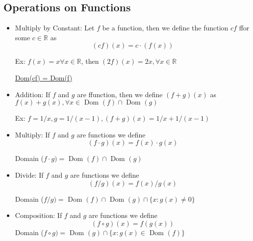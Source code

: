 \documentclass{report}
\begin{document}
    \subsection{Operations on Functions}%
    \begin{itemize}
      \item Multiply by Constant:  Let $f$ be a function, then we define
        the function $cf$ ffor some $ c\in \mathbb{R}$ as
        \[ (cf)(x) = c \cdot(f(x)) \]

        Ex: $f(x) = x \forall x \in \mathbb{R}$, then
        $(2f)(x) = 2x, \forall x \in \mathbb{R}$

        \underline{Dom(cf) = Dom(f)}
      \item Addition: If $f$ and $g$ are ffunction, then we define
        $(f + g)(x)$ as $f(x) + g(x), \forall x \in \text{ Dom }(f)
        \cap \text{ Dom }(g)$

        Ex: $f = 1/x, g = 1/(x-1), (f+g)(x) = 1/x + 1/(x-1)$

      \item Multiply: If $f$ and $g$ are functions we define
          \[ (f \cdot g)(x) = f(x) \cdot g(x) \]

          Domain ($f \cdot g) = \text{ Dom }(f) \cap \text{ Dom }(g)$

      \item Divide: If $f$ and $g$ are functions we define
          \[ (f / g)(x) = f(x) / g(x) \]

          Domain ($f / g) = \text{ Dom }(f) \cap \text{ Dom }(g)
          \cap \{x: g(x) \neq 0 \}$

      \item Composition: If $f$ and $g$ are functions we define
          \[ (f \circ g)(x) = f(g(x)) \]
          Domain ($f \circ g) = \text{ Dom }(g) \cap \{x: g(x) \in
          \text{ Dom }(f) \}$
    \end{itemize}

\end{document}
